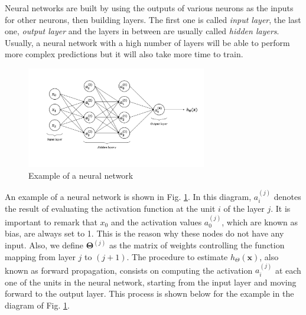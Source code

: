 \documentclass[a4paper, report, oneside, UKenglish]{memoir}
\newcommand{\x}{\boldsymbol{x}}
\newcommand{\bTheta}{\boldsymbol{\Theta}}
\begin{document}
Neural networks are built by using the outputs of various neurons as the inputs for other neurons, then building layers. The first one is called \textit{input layer}, the last one, \textit{output layer} and the layers in between are usually called \textit{hidden layers}. Usually, a neural network with a high number of layers will be able to perform more complex predictions but it will also take more time to train.

\begin{figure}[ht]
    \centering
    \includegraphics[width=0.7\textwidth]{figures/fitting/neural_network_example.png}
    \caption{Example of a neural network}
    \label{fig:neural_network_example}
\end{figure}

An example of a neural network is shown in Fig. \ref{fig:neural_network_example}. In this diagram, $a_i^{(j)}$ denotes the result of evaluating the activation function at the unit $i$ of the layer $j$. It is important to remark that $x_0$ and the activation values $a_0^{(j)}$, which are known as bias, are always set to 1. This is the reason why these nodes do not have any input. Also, we define $\bTheta^{(j)}$ as the matrix of weights controlling the function mapping from layer $j$ to $(j+1)$. The procedure to estimate $h_\Theta(\x)$, also known as forward propagation, consists on computing the activation $a_i^{(j)}$ at each one of the units in the neural network, starting from the input layer and moving forward to the output layer. This process is shown below for the example in the diagram of Fig. \ref{fig:neural_network_example}.
\end{document}

